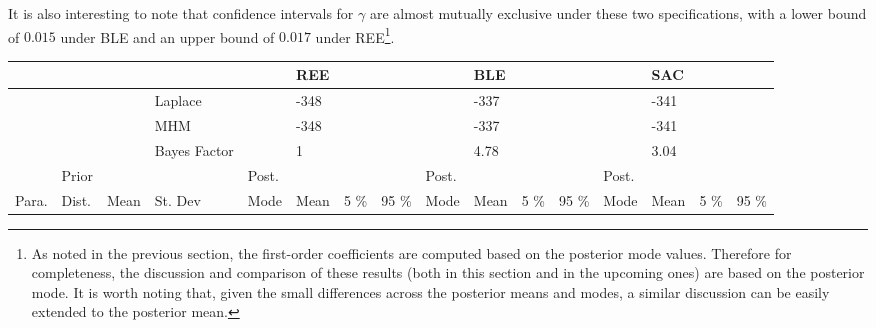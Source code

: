 It is also interesting to note that confidence intervals for $\gamma$ are almost mutually exclusive under these two specifications, with a lower bound of $0.015$ under BLE and an upper bound of $0.017$ under REE\footnote{As noted in the previous section, the first-order coefficients are computed based on the posterior mode values. Therefore for completeness, the discussion and comparison of these results (both in this section and in the upcoming ones) are based on the posterior mode. It is worth noting that, given the small differences across the posterior means and modes, a similar discussion can be easily extended to the posterior mean.}. 
\noindent





\begin{table}
\centering

\label{table3}
\vspace{2 mm}
\begin{tabular}{l|lll|llll||llll||llll}
& & & &      & REE &      &    &  & BLE &   &  &  & SAC &      &       \\
 \hline
 \hline
& & & Laplace      &      & -348 &  & &  &  -337  &       &  &  & -341 &      &       \\
& & & MHM          &      & -348 & &  &  &  -337   &       &  &    & -341 &      &       \\
\hline
\hline
& & & Bayes Factor          &      & 1 & &  &  & 4.78    &       &  &    & 3.04 &      &       \\
\hline
\hline
& Prior& &           &   Post.   &  & &  & Post. &     &       &  &  Post.  &  &      &       \\
\hline
\hline
Para. & Dist.&Mean&St. Dev    & Mode & Mean    & 5 \% & 95 \% &  Mode & Mean    & 5 \% & 95 \%                     & Mode       & Mean    & 5 \% & 95 \% \\


\end{tabular}
\end{table}
